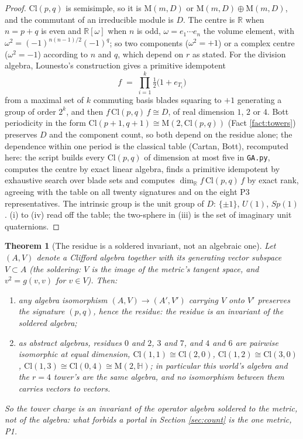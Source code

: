 \documentclass[11pt]{article}
\newtheorem{theorem}{Theorem}[section]
\theoremstyle{definition}
\newcommand{\Cl}{\mathrm{Cl}}
\newcommand{\R}{\mathbb{R}}
\newcommand{\Mat}{\mathrm{M}}
\begin{document}
\begin{proof}
$\Cl(p,q)$ is semisimple, so it is $\Mat(m, D)$ or $\Mat(m, D) \oplus \Mat(m, D)$, and the commutant of an irreducible module is $D$. The centre is $\R$ when $n = p + q$ is even and $\R[\omega]$ when $n$ is odd, $\omega = e_{1} \cdots e_{n}$ the volume element, with $\omega^{2} = (-1)^{n(n-1)/2}(-1)^{q}$; so two components ($\omega^{2} = +1$) or a complex centre ($\omega^{2} = -1$) according to $n$ and $q$, which depend on $r$ as stated. For the division algebra, Lounesto's construction gives a primitive idempotent
\[
f \;=\; \prod_{i=1}^{k}\tfrac{1}{2}\bigl(1 + e_{T_{i}}\bigr)
\]
from a maximal set of $k$ commuting basis blades squaring to $+1$ generating a group of order $2^{k}$, and then $f\,\Cl(p,q)\,f \cong D$, of real dimension $1$, $2$ or $4$. Bott periodicity in the form $\Cl(p+1, q+1) \cong \Mat(2, \Cl(p,q))$ (Fact \ref{fact:towers}) preserves $D$ and the component count, so both depend on the residue alone; the dependence within one period is the classical table (Cartan, Bott), recomputed here: the script builds every $\Cl(p,q)$ of dimension at most five in \texttt{GA.py}, computes the centre by exact linear algebra, finds a primitive idempotent by exhaustive search over blade sets and computes $\dim_{\R} f\,\Cl(p,q)\,f$ by exact rank, agreeing with the table on all twenty signatures and on the eight P3 representatives. The intrinsic group is the unit group of $D$: $\{\pm 1\}$, $U(1)$, $Sp(1)$. (i) to (iv) read off the table; the two-sphere in (iii) is the set of imaginary unit quaternions.
\end{proof}

\begin{theorem}[The residue is a soldered invariant, not an algebraic one]\label{thm:soldered}
Let $(A, V)$ denote a Clifford algebra together with its generating vector subspace $V \subset A$ (the soldering: $V$ is the image of the metric's tangent space, and $v^{2} = g(v,v)$ for $v \in V$). Then:
\begin{enumerate}
\item[(i)] any algebra isomorphism $(A, V) \to (A', V')$ carrying $V$ onto $V'$ preserves the signature $(p,q)$, hence the residue: the residue is an invariant of the soldered algebra;
\item[(ii)] as abstract algebras, residues $0$ and $2$, $3$ and $7$, and $4$ and $6$ are pairwise isomorphic at equal dimension, $\Cl(1,1) \cong \Cl(2,0)$, $\Cl(1,2) \cong \Cl(3,0)$, $\Cl(1,3) \cong \Cl(0,4) \cong \Mat(2, \mathbb{H})$; in particular this world's algebra and the $r = 4$ tower's are the same algebra, and no isomorphism between them carries vectors to vectors.
\end{enumerate}
So the tower charge is an invariant of the operator algebra soldered to the metric, not of the algebra: what forbids a portal in Section \ref{sec:count} is the one metric, P1.
\end{theorem}
\end{document}
